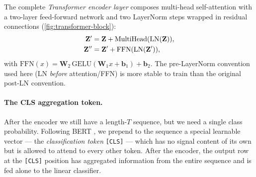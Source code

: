 The complete \emph{Transformer encoder layer} composes multi-head
self-attention with a two-layer feed-forward network and two LayerNorm
\cite{ba2016layer} steps wrapped in residual connections
(\cref{fig:transformer-block}):
\begin{align}
    \mathbf{Z}' &= \mathbf{Z} + \operatorname{MultiHead}(\mathrm{LN}(\mathbf{Z})), \\
    \mathbf{Z}'' &= \mathbf{Z}' + \mathrm{FFN}(\mathrm{LN}(\mathbf{Z}')),
\end{align}
with $\mathrm{FFN}(x) = \mathbf{W}_2 \, \mathrm{GELU}(\mathbf{W}_1 x + \mathbf{b}_1) + \mathbf{b}_2$.
The pre-LayerNorm convention used here (LN \emph{before} attention/FFN)
is more stable to train than the original post-LN convention.

\paragraph{The CLS aggregation token.}
After the encoder we still have a length-$T$ sequence, but we need a
single class probability. Following BERT \cite{devlin2019bert}, we
prepend to the sequence a special learnable vector --- the
\emph{classification token} \texttt{[CLS]} --- which has no signal
content of its own but is allowed to attend to every other token. After
the encoder, the output row at the \texttt{[CLS]} position has
aggregated information from the entire sequence and is fed alone to the
linear classifier.

